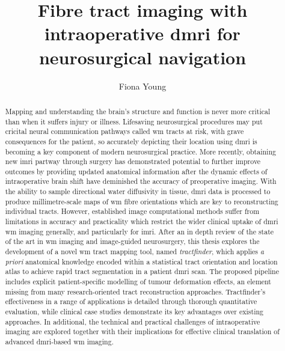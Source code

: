 
\title{ Fibre tract imaging with intraoperative \gls{dmri} for neurosurgical navigation }
\author{ Fiona Young }

\maketitle
\makedeclaration

\begin{abstract} %
Mapping and understanding the brain's structure and function is never more critical than when it suffers injury or illness.
Lifesaving neurosurgical procedures may put cricital neural communication pathways called \gls{wm} tracts at risk, with grave consequences for the patient, so accurately depicting their location using \gls{dmri} is becoming a key component of modern neurosurgical practice.
More recently, obtaining new \gls{imri} partway through surgery has demonstrated potential to further improve outcomes by providing updated anatomical information after the dynamic effects of intraoperative brain shift have deminished the accuracy of preoperative imaging.
With the ability to sample directional water diffusivity in tissue, \gls{dmri} data is processed to produce millimetre-scale maps of \gls{wm} fibre orientations which are key to reconstructing individual tracts.
However, established image computational methods suffer from limitations in accuracy and practicality which restrict the wider clinical uptake of \gls{dmri} \gls{wm} imaging generally, and particularly for \gls{imri}.
After an in depth review of the state of the art in \gls{wm} imaging and image-guided neurosurgery, this thesis explores the development of a novel \gls{wm} tract mapping tool, named \textit{tractfinder}, which applies \textit{a priori} anatomical knowledge encoded within a statistical tract orientation and location atlas to achieve rapid tract segmentation in a patient \gls{dmri} scan.
The proposed pipeline includes explicit patient-specific modelling of tumour deformation effects, an element missing from many research-oriented tract reconstruction approaches.
Tractfinder's effectiveness in a range of applications is detailed through thorough quantitative evaluation, while clinical case studies demonstrate its key advantages over existing approaches.
In additional, the technical and practical challenges of intraoperative imaging are explored together with their implications for effective clinical translation of advanced \gls{dmri}-based \gls{wm} imaging.
\end{abstract}


